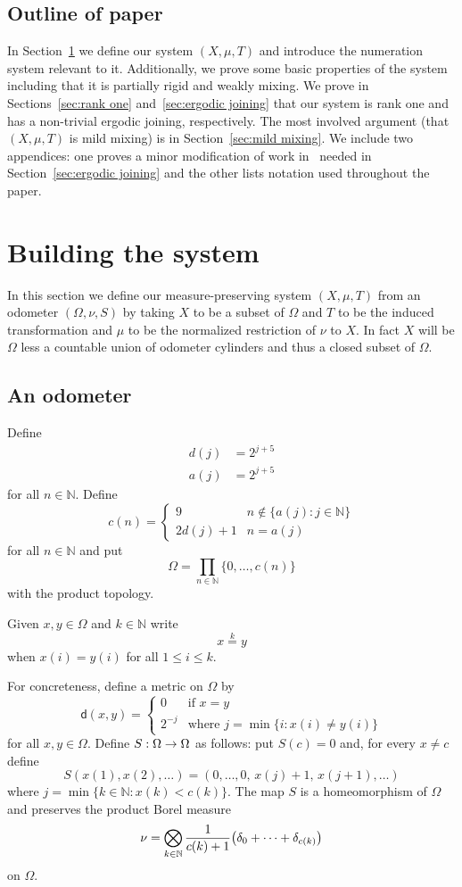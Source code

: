 \documentclass[AHL,Unicode,longabstracts,published]{cedram}
\newcommand{\N}{\mathbb{N}}
\newcommand{\metric}{\mathsf{d}}
\let\originalleft\left
\let\originalright\right
\renewcommand{\left}{\mathopen{}\mathclose\bgroup\originalleft}
\renewcommand{\right}{\aftergroup\egroup\originalright}
\renewcommand*{\to}{\mathchoice{\longrightarrow}{\rightarrow}{\rightarrow}{\rightarrow}}
\begin{document}
\subsection{Outline of paper} 

In Section~\ref{sec:system} we define our system $(X,\mu,T)$ and introduce the numeration system relevant to it. Additionally, we prove some basic properties of the system including that it is partially rigid and weakly mixing. We prove in Sections~\ref{sec:rank one} and~\ref{sec:ergodic joining} that our system is rank one and has a non-trivial ergodic joining, respectively. The most involved argument (that $(X,\mu,T)$ is mild mixing) is in Section~\ref{sec:mild mixing}. We include two appendices: one proves a minor modification of work in~\cite{MR4269425} needed in Section~\ref{sec:ergodic joining} and the other lists notation used throughout the paper.



\section{Building the system}\label{sec:system}

In this section we define our measure-preserving system $(X,\mu,T)$ from an odometer $(\Omega,\nu,S)$ by taking $X$ to be a subset of $\Omega$ and $T$ to be the induced transformation and $\mu$ to be the normalized restriction of $\nu$ to $X$. In fact $X$ will be $\Omega$ less a countable union of odometer cylinders and thus a closed subset of $\Omega$.

\subsection{An odometer}

Define
\begin{align*}
d(j) &{} = 2^{j+5} \\
a(j) &{} = 2^{j+5}
\end{align*}
for all $n \in \N$. Define
\[
c(n) =
\begin{cases}
9 & n \notin \{ a(j) : j \in \N \} \\
2 d(j) + 1 & n = a(j)
\end{cases}
\]
for all $n \in \N$ and put
\[
\Omega = \prod_{n \in \N} \{0,\dots,c(n) \}
\]
with the product topology.

Given $x,y \in \Omega$ and $k \in \N$ write
\[
x \overset{k}{=} y
\]
when $x(i) = y(i)$ for all $1 \le i \le k$.

For concreteness, define a metric on $\Omega$ by
\[
\metric(x,y) =
\begin{cases}
0  &\text{if } x=y \\
2^{-j} &\text{where } j = \min\{i:x(i)\neq y(i)\}
\end{cases}
\]
for all $x,y \in \Omega$. Define $S : \Omega \to \Omega$ as follows: put $S(c) = 0$ and, for every $x \ne c$ define
\[
S(x(1),x(2),\dots) = (0,\dots,0,\,x(j) + 1,\,x(j+1),\dots)
\]
where $j = \min \{ k \in \N : x(k) < c(k) \}$. The map $S$ is a homeomorphism of $\Omega$ and preserves the product Borel measure
\[
\nu = \bigotimes_{k \in \N} \frac{1}{c(k) + 1} \left(\delta_0 + \dots + \delta_{c(k)}\right)
\]
on $\Omega$.
\end{document}
